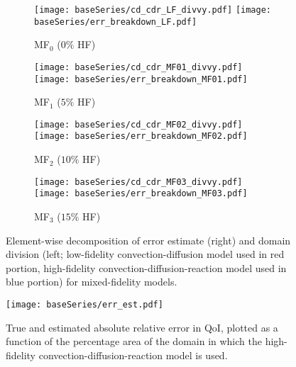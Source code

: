 \begin{figure}[h!]
\centering
  \begin{subfigure}[b]{\textwidth}
  \centering
    \texttt{[image: baseSeries/cd\_cdr\_LF\_divvy.pdf]}
    \texttt{[image: baseSeries/err\_breakdown\_LF.pdf]}
    \vspace{-0.5\baselineskip}
    \caption{MF$_0$ ($0\%$ HF)}
    \vspace{0.8\baselineskip}
  \end{subfigure}
	\begin{subfigure}[b]{\textwidth}
  \centering
    \texttt{[image: baseSeries/cd\_cdr\_MF01\_divvy.pdf]}
    \texttt{[image: baseSeries/err\_breakdown\_MF01.pdf]}
    \vspace{-0.5\baselineskip}
    \caption{MF$_1$ ($5\%$ HF)}
    \vspace{0.8\baselineskip}
  \end{subfigure}
  \begin{subfigure}[b]{\textwidth}
  \centering
    \texttt{[image: baseSeries/cd\_cdr\_MF02\_divvy.pdf]}
    \texttt{[image: baseSeries/err\_breakdown\_MF02.pdf]}
    \vspace{-0.5\baselineskip}
    \caption{MF$_2$ ($10\%$ HF)}
    \vspace{0.8\baselineskip}
  \end{subfigure}
  \begin{subfigure}[b]{\textwidth}
  \centering
    \texttt{[image: baseSeries/cd\_cdr\_MF03\_divvy.pdf]}
    \texttt{[image: baseSeries/err\_breakdown\_MF03.pdf]}
    \vspace{-0.5\baselineskip}
    \caption{MF$_3$ ($15\%$ HF)}
    \vspace{0.8\baselineskip}
  \end{subfigure}
\caption{Element-wise decomposition of error estimate (right) and domain division (left; low-fidelity convection-diffusion model used in red portion, high-fidelity convection-diffusion-reaction model used in blue portion) for mixed-fidelity models.}
\label{fig:baseRef}
\end{figure}

\begin{figure}[h]
\centering
\texttt{[image: baseSeries/err\_est.pdf]}
\caption{True and estimated absolute relative error in QoI, plotted as a function of the percentage area of the domain in which the high-fidelity convection-diffusion-reaction model is used.}
\label{fig:baseErr}
\end{figure}

